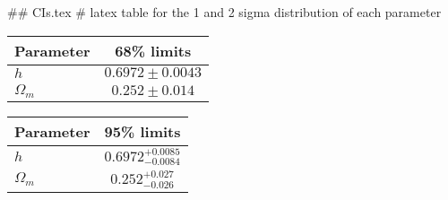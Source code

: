 ## CIs.tex
# latex table for the 1 and 2 sigma distribution of each parameter

\begin{tabular} { l  c}
 Parameter &  68\% limits\\
\hline
{\boldmath$h              $} & $0.6972\pm 0.0043          $\\
{\boldmath$\Omega_m       $} & $0.252\pm 0.014            $\\
\hline
\end{tabular}

\begin{tabular} { l  c}
 Parameter &  95\% limits\\
\hline
{\boldmath$h              $} & $0.6972^{+0.0085}_{-0.0084}$\\
{\boldmath$\Omega_m       $} & $0.252^{+0.027}_{-0.026}   $\\
\hline
\end{tabular}
